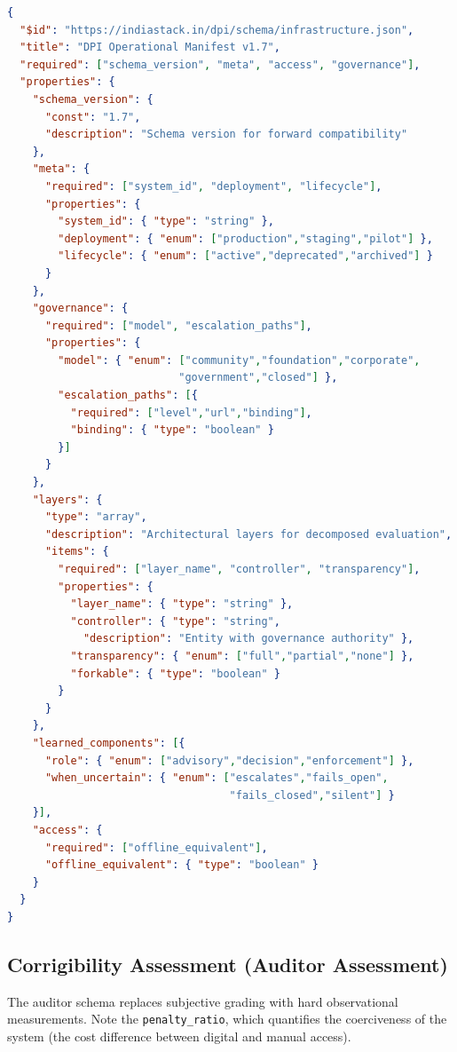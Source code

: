 \begin{lstlisting}[language=json,caption={Operator Disclosure Schema (condensed)}]
{
  "$id": "https://indiastack.in/dpi/schema/infrastructure.json",
  "title": "DPI Operational Manifest v1.7",
  "required": ["schema_version", "meta", "access", "governance"],
  "properties": {
    "schema_version": {
      "const": "1.7",
      "description": "Schema version for forward compatibility"
    },
    "meta": {
      "required": ["system_id", "deployment", "lifecycle"],
      "properties": {
        "system_id": { "type": "string" },
        "deployment": { "enum": ["production","staging","pilot"] },
        "lifecycle": { "enum": ["active","deprecated","archived"] }
      }
    },
    "governance": {
      "required": ["model", "escalation_paths"],
      "properties": {
        "model": { "enum": ["community","foundation","corporate",
                           "government","closed"] },
        "escalation_paths": [{
          "required": ["level","url","binding"],
          "binding": { "type": "boolean" }
        }]
      }
    },
    "layers": {
      "type": "array",
      "description": "Architectural layers for decomposed evaluation",
      "items": {
        "required": ["layer_name", "controller", "transparency"],
        "properties": {
          "layer_name": { "type": "string" },
          "controller": { "type": "string",
            "description": "Entity with governance authority" },
          "transparency": { "enum": ["full","partial","none"] },
          "forkable": { "type": "boolean" }
        }
      }
    },
    "learned_components": [{
      "role": { "enum": ["advisory","decision","enforcement"] },
      "when_uncertain": { "enum": ["escalates","fails_open",
                                   "fails_closed","silent"] }
    }],
    "access": {
      "required": ["offline_equivalent"],
      "offline_equivalent": { "type": "boolean" }
    }
  }
}
\end{lstlisting}

\subsection{Corrigibility Assessment (Auditor Assessment)}

The auditor schema replaces subjective grading with hard observational measurements. Note the \texttt{penalty\_ratio}, which quantifies the coerciveness of the system (the cost difference between digital and manual access).

